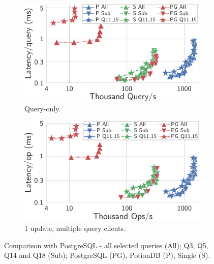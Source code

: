 \documentclass[sigplan,twocolumn,review,anonymous]{acmart}
\begin{document}
\begin{figure}[t]
	\centering
	\begin{minipage}{.57\linewidth}
		\begin{subfigure}{.482\linewidth}
			\includegraphics[width=1\linewidth]{postgres/postgresQueryOnly}
	\vspace{-10pt}
			\caption{Query-only.}
			\label{fig:postgres_query}
		\end{subfigure}%
		\hspace*{0.4em}
		\begin{subfigure}{.483\linewidth}
			\includegraphics[width=1\linewidth]{postgres/postgresUpdateOnlyOps}
	\vspace{-10pt}
			\caption{1 update, multiple query clients.}
			\label{fig:postgres_update}
		\end{subfigure}%
	\vspace{-10pt}
		\caption{Comparison with PostgreSQL - all selected queries (All); Q3, Q5, Q14 and Q18 (Sub); PostgreSQL (PG), PotionDB (P), Single (S).}

\end{minipage}
\end{figure}
\end{document}

